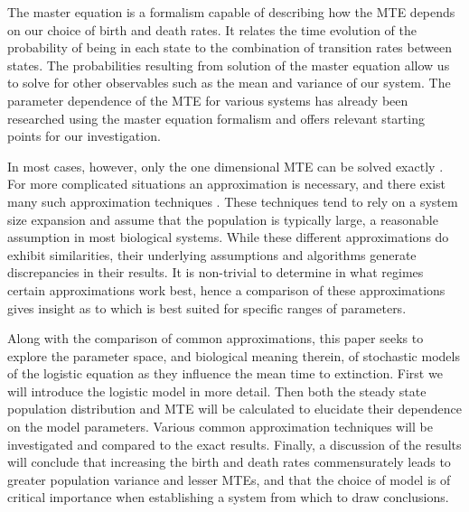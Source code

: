 The master equation is a formalism capable of describing how the MTE depends on our choice of birth and death rates.
It relates the time evolution of the probability of being in each state to the combination of transition rates between states.
The probabilities resulting from solution of the master equation allow us to solve for other observables such as the mean and variance of our system.
The parameter dependence of the MTE for various systems has already been researched using the master equation formalism \cite{Nisbet1982} and offers relevant starting points for our investigation. 

In most cases, however, only the one dimensional MTE can be solved exactly \cite{Norden1982}.
For more complicated situations an approximation is necessary, and there exist many such approximation techniques \cite{Nisbet1982,Gardiner2004}.
These techniques tend to rely on a system size expansion and assume that the population is typically large, a reasonable assumption in most biological systems. 
While these different approximations do exhibit similarities, their underlying assumptions and algorithms generate discrepancies in their results. 
It is non-trivial to determine in what regimes certain approximations work best, hence a comparison of these approximations gives insight as to which is best suited for specific ranges of parameters. 

Along with the comparison of common approximations, this paper seeks to explore the parameter space, and biological meaning therein, of stochastic models of the logistic equation as they influence the mean time to extinction. 
First we will introduce the logistic model in more detail.
Then both the steady state population distribution and MTE will be calculated to elucidate their dependence on the model parameters. 
Various common approximation techniques will be investigated and compared to the exact results. 
Finally, a discussion of the results will conclude that increasing the birth and death rates commensurately leads to greater population variance and lesser MTEs, and that the choice of model is of critical importance when establishing a system from which to draw conclusions.

